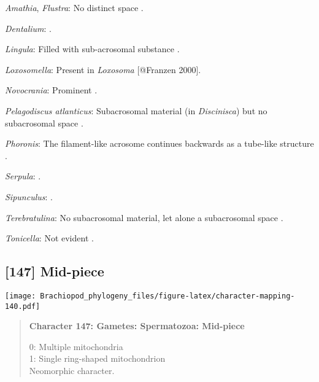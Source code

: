 \documentclass[openany]{book}
\theoremstyle{definition}
\theoremstyle{definition}
\theoremstyle{definition}
\theoremstyle{remark}
\begin{document}
\hypertarget{Amathia-coding-146}{}
\emph{Amathia}, \emph{Flustra}: No distinct space \citep[in
\emph{Tubulipora};][]{Franzen1984}.

\hypertarget{Dentalium-coding-146}{}
\emph{Dentalium}: \citet{DufresneDube1983}.

\hypertarget{Lingula-coding-146}{}
\emph{Lingula}: Filled with sub-acrosomal substance
\citep{Fukumoto2003Theacrosome}.

\hypertarget{Loxosomella-coding-146}{}
\emph{Loxosomella}: Present in \emph{Loxosoma} {[}@Franzen 2000{]}.

\hypertarget{Novocrania-coding-146}{}
\emph{Novocrania}: Prominent \citep{Afzelius1978Finestructure}.

\hypertarget{Pelagodiscus_atlanticus-coding-146}{}
\emph{Pelagodiscus atlanticus}: Subacrosomal material (in
\emph{Discinisca}) but no subacrosomal space
\citep{Hodgson1994Ultrastructureof}.

\hypertarget{Phoronis-coding-146}{}
\emph{Phoronis}: The filament-like acrosome continues backwards as a
tube-like structure \citep[summarized in
\citet{Jamieson1991FishEvolution}]{Franzen1980Ultrastructureof}.

\hypertarget{Serpula-coding-146}{}
\emph{Serpula}: \citet{Gherardi2011}.

\hypertarget{Sipunculus-coding-146}{}
\emph{Sipunculus}: \citet{Rice1993}.

\hypertarget{Terebratulina-coding-146}{}
\emph{Terebratulina}: No subacrosomal material, let alone a subacrosomal
space \citep[e.g.][]{Hodgson1994Ultrastructureof}.

\hypertarget{Tonicella-coding-146}{}
\emph{Tonicella}: Not evident \citep{BucklandNicks1988}.

\subsection*{{[}147{]} Mid-piece}\label{mid-piece}

\texttt{[image: Brachiopod\_phylogeny\_files/figure-latex/character-mapping-140.pdf]}

\begin{quote}
\textbf{Character 147: Gametes: Spermatozoa: Mid-piece}

0: Multiple mitochondria\\
1: Single ring-shaped mitochondrion\\
Neomorphic character.
\end{quote}
\end{document}
